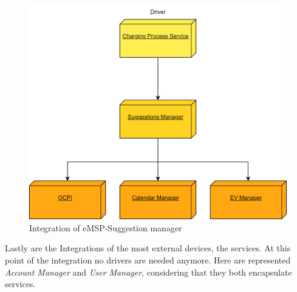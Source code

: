 \documentclass[table, 12pt]{article}
\begin{document}
\begin{figure}[H]
    \centering
    \includegraphics[scale=0.6]{assets/Integration Diagrams/eMSP-Suggestions Manager.png} 
    \caption{Integration of eMSP-Suggestion manager}%
    \label{fig: eMSP-Suggestion manager}%
\end{figure}

Lastly are the Integrations of the most external devices, the services. At this point of the integration no drivers are needed anymore.
Here are represented \emph{Account Manager} and \emph{User Manager}, considering that they both encapsulate services.
\end{document}

